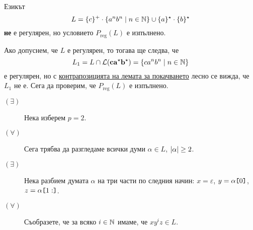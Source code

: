 \begin{example}
  Езикът
  \[L = \{c\}^+\cdot\{a^nb^n\mid n\in\mathbb{N}\}\cup \{a\}^\star \cdot \{b\}^\star\]
  {\bf не} е регулярен, но условието $P_{\text{reg}}(L)$ е изпълнено.
\end{example}
\begin{hint}
  Ако допуснем, че $L$ е регулярен, то тогава ще следва, че 
  \[L_1 = L\cap \mathcal{L}(\mathbf{ca^\star b^\star}) = \{ca^nb^n \mid n\in\mathbb{N}\}\]
  е регулярен, но с \hyperref[cor:pumping-reg]{контрапозицията на лемата за покачването} лесно се вижда, че $L_1$ не е. Сега да проверим, че $P_{\text{reg}}(L)$ е изпълнено. 
  \begin{description}
  \item[$(\exists)$]
    Нека изберем $p = 2$.
  \item[$(\forall)$]
    Сега трябва да разгледаме всички думи $\alpha \in L$, $\vert{\alpha}\vert \geq 2$.
  \item[$(\exists)$]
    Нека разбием думата $\alpha$ на три части по следния начин:
    $x = \varepsilon$, $y = \alpha\texttt{[}{0}\texttt{]}$, $z = \alpha\texttt{[}{1:}\texttt{]}$.
  \item[$(\forall)$]
    Съобразете, че за всяко $i \in \mathbb{N}$ имаме, че $xy^iz \in L$.
  \end{description}
\end{hint}



